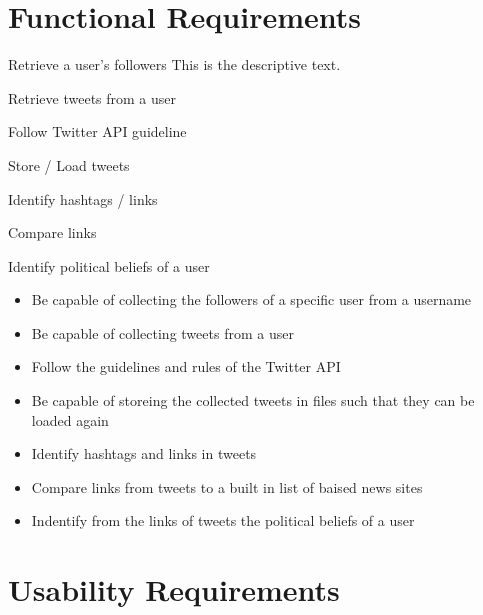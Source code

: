 \section{Functional Requirements}

\begin{requirement}{Retrieve a user's followers}
This is the descriptive text.
\end{requirement}

\begin{requirement}{Retrieve tweets from a user}

\end{requirement}

\begin{requirement}{Follow Twitter API guideline}

\end{requirement}

\begin{requirement}{Store / Load tweets}

\end{requirement}

\begin{requirement}{Identify hashtags / links}

\end{requirement}

\begin{requirement}{Compare links}

\end{requirement}

\begin{requirement}{Identify political beliefs of a user }

\end{requirement}
\begin{itemize}
 \item Be capable of collecting the followers of a specific user from a username
 \item Be capable of collecting tweets from a user
 \item Follow the guidelines and rules of the Twitter API
 \item Be capable of storeing the collected tweets in files such that they can
 be loaded again
 \item Identify hashtags and links in tweets
 \item Compare links from tweets to a built in list of baised news sites
 \item Indentify from the links of tweets the political beliefs of a user
\end{itemize}

\section{Usability Requirements}
